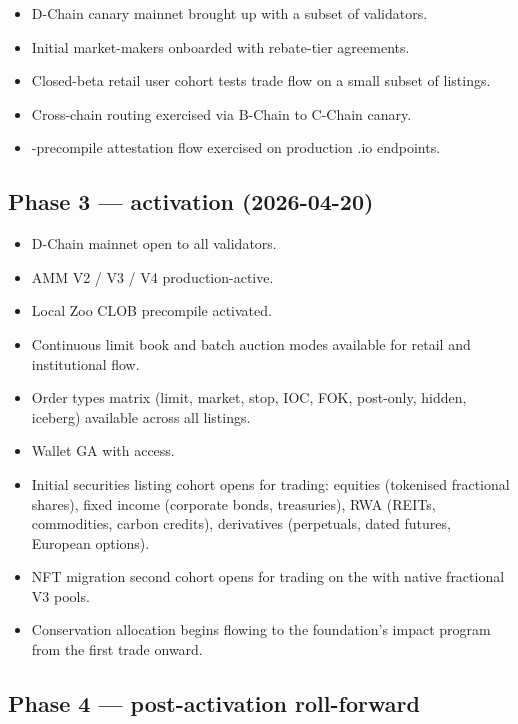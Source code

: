 \begin{itemize}[leftmargin=1.2em]
  \item \Zoo{} D-Chain canary mainnet brought up with a subset of
        validators.
  \item Initial market-makers onboarded with rebate-tier
        agreements.
  \item Closed-beta retail user cohort tests trade flow on a small
        subset of listings.
  \item Cross-chain routing exercised via B-Chain to \Lux{} C-Chain
        canary.
  \item \Liquidity{}-precompile attestation flow exercised on
        production \Liquidity{}.io endpoints.
\end{itemize}

\subsection{Phase 3 --- activation (2026-04-20)}

\begin{itemize}[leftmargin=1.2em]
  \item \Zoo{} D-Chain mainnet open to all validators.
  \item AMM V2 / V3 / V4 production-active.
  \item Local Zoo \DEX{} CLOB precompile activated.
  \item Continuous limit book and batch auction modes available
        for retail and institutional flow.
  \item Order types matrix (limit, market, stop, IOC, FOK,
        post-only, hidden, iceberg) available across all listings.
  \item Wallet GA with \Zoo{} \DEX{} access.
  \item Initial securities listing cohort opens for trading:
        equities (tokenised fractional shares), fixed income
        (corporate bonds, treasuries), RWA (REITs, commodities,
        carbon credits), derivatives (perpetuals, dated futures,
        European options).
  \item NFT migration second cohort opens for trading on the \DEX{}
        with native fractional V3 pools.
  \item Conservation allocation begins flowing to the foundation's
        impact program from the first trade onward.
\end{itemize}

\subsection{Phase 4 --- post-activation roll-forward}

